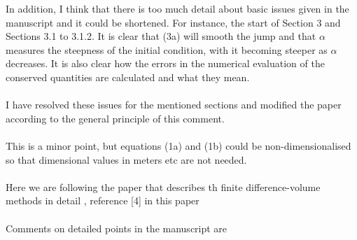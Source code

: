 \documentclass[times]{article}
\begin{document}
	In addition, I think that there	is too much detail about basic issues given in the manuscript and it could be shortened. For instance, the start of Section 3 and Sections 3.1 to 3.1.2. It is clear that (3a) will smooth
	the jump and that $\alpha$ measures the steepness of the initial condition, with it becoming steeper as $\alpha$ decreases. It is also clear how the errors in the numerical evaluation of the conserved quantities are calculated and what they mean. \\ \\
		{\color{blue} I have resolved these issues for the mentioned sections and modified the paper according to the general principle of this comment. } \\ \\	
	This is a minor point, but equations (1a) and (1b) could be non-dimensionalised so that dimensional values in meters etc are not needed.
	\\ \\
	{\color{blue} Here we are following the paper that describes th finite difference-volume methods in detail , reference [4] in this paper } \\ \\
	
	Comments on detailed points in the manuscript are 
	
\end{document}

